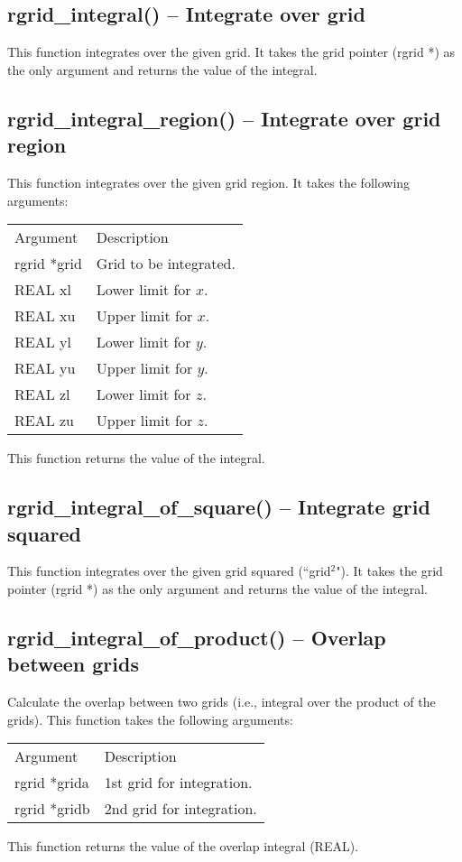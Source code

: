 \documentclass[12pt,letterpaper]{report}
\begin{document}
\subsection{rgrid\_integral() -- Integrate over grid}

This function integrates over the given grid. It takes the grid pointer (rgrid *) as the only argument and returns the value of the integral. 

\subsection{rgrid\_integral\_region() -- Integrate over grid region}

This function integrates over the given grid region. It takes the following arguments:
\begin{longtable}{p{} p{}}
Argument & Description\\
\cline{1-2}
rgrid *grid & Grid to be integrated.\\
REAL xl & Lower limit for $x$.\\
REAL xu & Upper limit for $x$.\\
REAL yl & Lower limit for $y$.\\
REAL yu & Upper limit for $y$.\\
REAL zl & Lower limit for $z$.\\
REAL zu & Upper limit for $z$.\\
\end{longtable}
\noindent
This function returns the value of the integral. 

\subsection{rgrid\_integral\_of\_square() -- Integrate grid squared}

This function integrates over the given grid squared (``grid$^2$"). It takes the grid pointer (rgrid *) as the only argument and returns the value of the integral.

\subsection{rgrid\_integral\_of\_product() -- Overlap between grids}

Calculate the overlap between two grids (i.e., integral over the product of the grids). This function takes the following arguments:
\begin{longtable}{p{} p{}}
Argument & Description\\
\cline{1-2}
rgrid *grida & 1st grid for integration.\\
rgrid *gridb & 2nd grid for integration.\\
\end{longtable}
\noindent
This function returns the value of the overlap integral (REAL).
\end{document}
